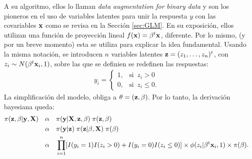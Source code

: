 \documentclass[../Main/Main.tex]{subfiles}
\begin{document}
A su algoritmo, ellos lo llaman \textit{data augmentation for binary data} y son los pioneros en el uso de variables latentes para unir la respuesta $y$ con las covariables $\mathbf{x}$ como se revisa en la Sección \ref{sec:GLM}. En su exposición, ellos utilizan una función de proyección lineal $f(\mathbf{x}) = \beta^t\mathbf{x}$, diferente. Por lo mismo, (y por un breve momento) esta se utiliza para explicar la idea fundamental. Usando la misma notación, se introducen $n$ variables latentes $\mathbf{z} = (z_1,\ldots,z_n)^t$, con $z_i \sim N(\beta^t\mathbf{x}_i,1)$, sobre las que se definien se redefinen las respuestas:
\begin{align}
y_i = 
	\begin{cases}
		1, & \text{si }\, z_i > 0 \\											0, & \text{si }\, z_i \leq 0 .
	\end{cases} \label{ec:DefY}
\end{align}
La simplificación del modelo, obliga a $\theta = (\mathbf{z}, \beta)$. Por lo tanto, la derivación bayesiana queda:
\begin{align}
	\pi(\mathbf{z}, \beta| \mathbf{y}, \mathbf{X}) \quad 
	& \alpha \quad \pi(\mathbf{y} | \mathbf{X}, \mathbf{z}, \beta) 
		\; \pi(\mathbf{z}, \beta) \nonumber \\
	& \alpha \quad \pi(\mathbf{y} | \mathbf{z})\; \pi(\mathbf{z}|\beta,\mathbf{X}) 
		\; \pi(\beta) \nonumber \\
	& \alpha \quad \prod_{i = 1}^n[I(y_i = 1)I(z_i > 0) +
		 I(y_i = 0)I(z_i \leq 0)] \times \phi(z_i|\beta^t\mathbf{x}_i,1) 				\times \pi(\beta). \label{ec:BayesChibbPosterior}
\end{align}
\end{document}
